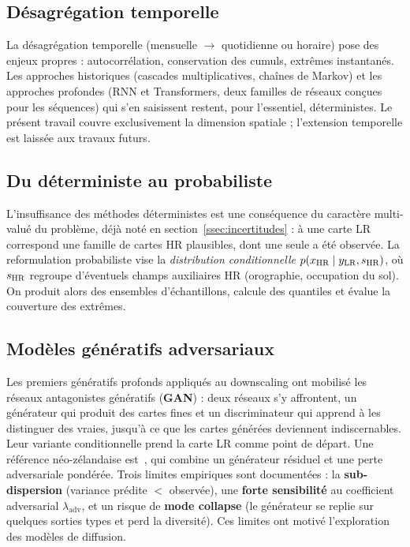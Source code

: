 \subsection{Désagrégation temporelle}
\label{ssec:disagg-temporelle}

La désagrégation temporelle (mensuelle $\to$ quotidienne ou horaire) pose des enjeux propres : autocorrélation, conservation des cumuls, extrêmes instantanés. Les approches historiques (cascades multiplicatives, chaînes de Markov) et les approches profondes (RNN et Transformers, deux familles de réseaux conçues pour les séquences) qui s'en saisissent restent, pour l'essentiel, déterministes. Le présent travail couvre exclusivement la dimension spatiale ; l'extension temporelle est laissée aux travaux futurs.

\label{sec:generatifs}

\subsection{Du déterministe au probabiliste}
\label{ssec:det-vs-proba}

L'insuffisance des méthodes déterministes est une conséquence du caractère multi-valué du problème, déjà noté en section~\ref{ssec:incertitudes} : à une carte LR correspond une famille de cartes HR plausibles, dont une seule a été observée. La reformulation probabiliste vise la \emph{distribution conditionnelle} $p(x_{\text{HR}} \mid y_{\text{LR}}, s_{\text{HR}})$, où $s_{\text{HR}}$ regroupe d'éventuels champs auxiliaires HR (orographie, occupation du sol). On produit alors des ensembles d'échantillons, calcule des quantiles et évalue la couverture des extrêmes.

\subsection{Modèles génératifs adversariaux}
\label{ssec:gan}

Les premiers génératifs profonds appliqués au downscaling ont mobilisé les réseaux antagonistes génératifs (\textbf{GAN}) : deux réseaux s'y affrontent, un générateur qui produit des cartes fines et un discriminateur qui apprend à les distinguer des vraies, jusqu'à ce que les cartes générées deviennent indiscernables. Leur variante conditionnelle prend la carte LR comme point de départ. Une référence néo-zélandaise est~\cite{rampal_cgan_2024}, qui combine un générateur résiduel et une perte adversariale pondérée. Trois limites empiriques sont documentées : la \textbf{sub-dispersion} (variance prédite $<$ observée), une \textbf{forte sensibilité} au coefficient adversarial $\lambda_{\mathrm{adv}}$, et un risque de \textbf{mode collapse} (le générateur se replie sur quelques sorties types et perd la diversité). Ces limites ont motivé l'exploration des modèles de diffusion.

